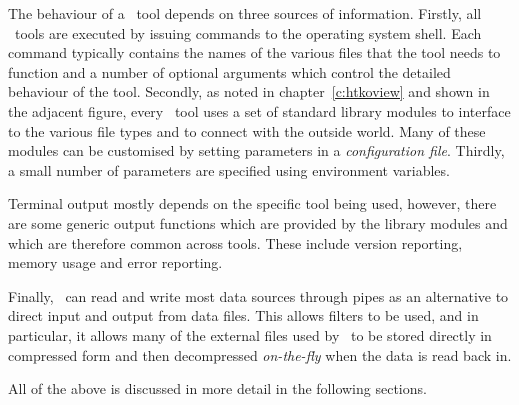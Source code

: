 The behaviour of a \HTK\ tool depends on three sources of information.
Firstly,
all \HTK\ tools are executed by issuing commands to the operating
system shell.  
Each command typically contains the names of the various files that the
tool needs to function and a number of optional arguments which 
control the detailed behaviour of the tool.  
Secondly, 
as noted in chapter~\ref{c:htkoview} and shown in the adjacent figure, every \HTK\ tool uses a set
of standard library modules to interface to the various file types and
to connect with the outside world.  Many of these modules can be
customised by setting parameters in a {\it configuration file}.
Thirdly, a small number of parameters are specified using
environment variables.  

Terminal output mostly depends on the specific tool 
being used, however, there
are some generic output functions which are provided by the library
modules and which are therefore common across tools.  These include
version reporting, memory usage and error reporting.

Finally, \HTK\ can read and write most data sources through pipes as an alternative
to direct input and output from data files.  This allows 
filters to be used, and in particular, it allows many of the external
files used by \HTK\ to be stored directly in compressed form and then decompressed
\textit{on-the-fly} when the data is read back in.

All of the above is discussed in more detail in the following sections.


